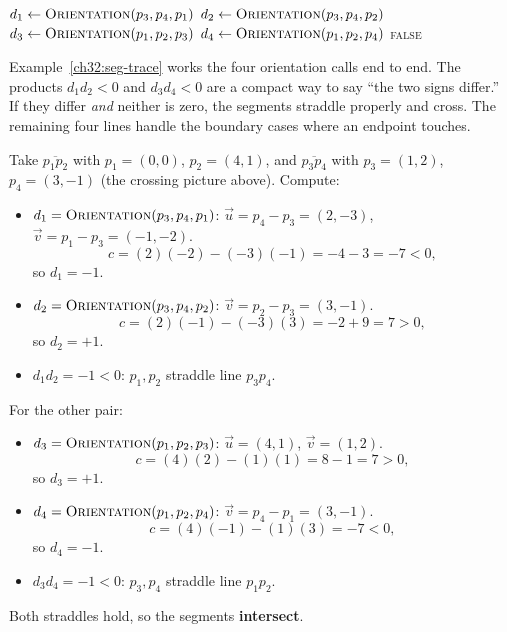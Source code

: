 \begin{algorithm}[H]
\caption{\textsc{SegmentsIntersect}($p_1, p_2, p_3, p_4$)}
$d_1 \leftarrow \textsc{Orientation}(p_3,p_4,p_1)$\;
$d_2 \leftarrow \textsc{Orientation}(p_3,p_4,p_2)$\;
$d_3 \leftarrow \textsc{Orientation}(p_1,p_2,p_3)$\;
$d_4 \leftarrow \textsc{Orientation}(p_1,p_2,p_4)$\;
\Return \textsc{false}\;
\end{algorithm}

Example~\ref{ch32:seg-trace} works the four orientation calls end to end. The
products $d_1 d_2 < 0$ and $d_3 d_4 < 0$ are a compact way to say ``the two signs
differ.'' If they differ \emph{and} neither is zero, the segments straddle
properly and cross. The remaining four lines handle the boundary cases where an
endpoint touches.

\begin{example}\label{ch32:seg-trace}
Take $\overline{p_1 p_2}$ with $p_1=(0,0)$, $p_2=(4,1)$, and $\overline{p_3 p_4}$
with $p_3=(1,2)$, $p_4=(3,-1)$ (the crossing picture above). Compute:
\begin{itemize}
  \item $d_1=\textsc{Orientation}(p_3,p_4,p_1)$: $\vec u = p_4-p_3=(2,-3)$,
        $\vec v = p_1-p_3=(-1,-2)$.
        \[ c = (2)(-2)-(-3)(-1) = -4-3 = -7 < 0, \]
        so $d_1=-1$.
  \item $d_2=\textsc{Orientation}(p_3,p_4,p_2)$: $\vec v=p_2-p_3=(3,-1)$.
        \[ c = (2)(-1)-(-3)(3) = -2+9 = 7 > 0, \]
        so $d_2=+1$.
  \item $d_1 d_2 = -1 < 0$: $p_1,p_2$ straddle line $p_3 p_4$. \checkmark
\end{itemize}
For the other pair:
\begin{itemize}
  \item $d_3=\textsc{Orientation}(p_1,p_2,p_3)$: $\vec u=(4,1)$, $\vec v=(1,2)$.
        \[ c = (4)(2)-(1)(1) = 8-1 = 7 > 0, \]
        so $d_3=+1$.
  \item $d_4=\textsc{Orientation}(p_1,p_2,p_4)$: $\vec v=p_4-p_1=(3,-1)$.
        \[ c = (4)(-1)-(1)(3) = -7 < 0, \]
        so $d_4=-1$.
  \item $d_3 d_4 = -1 < 0$: $p_3,p_4$ straddle line $p_1 p_2$. \checkmark
\end{itemize}
Both straddles hold, so the segments \textbf{intersect}. \checkmark
\end{example}

